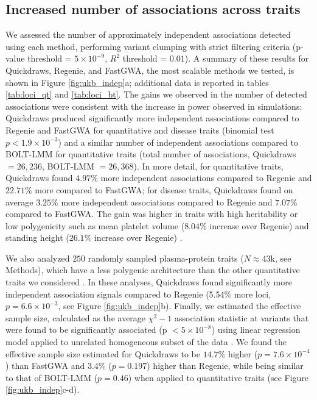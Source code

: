 \clearpage

\subsection{Increased number of associations across traits}
We assessed the number of approximately independent associations detected using each method, performing variant clumping with strict filtering criteria (p-value threshold = $5 \times 10^{-9}$, $R^2$ threshold = $0.01$).
%
A summary of these results for Quickdraws, Regenie, and FastGWA, the most scalable methods we tested, is shown in Figure \ref{fig:ukb_indep}a; additional data is reported in tables \ref{tab:loci_qt} and \ref{tab:loci_bt}. 
%
The gains we observed in the number of detected associations were consistent with the increase in power observed in simulations: Quickdraws produced significantly more independent associations compared to Regenie and FastGWA for quantitative and disease traits (binomial test $p < 1.9 \times 10^{-3}$) and a similar number of independent associations compared to BOLT-LMM for quantitative traits (total number of associations, Quickdraws $=26{,}236$, BOLT-LMM $=26{,}368$).
%
In more detail, for quantitative traits, Quickdraws found $4.97\%$ more independent associations compared to Regenie and $22.71\%$ more compared to FastGWA; for disease traits, Quickdraws found on average $3.25\%$ more independent associations compared to Regenie and $7.07\%$ compared to FastGWA.
%
The gain was higher in traits with high heritability or low polygenicity such as mean platelet volume ($8.04\%$ increase over Regenie) and standing height ($26.1\%$ increase over Regenie) \cite{zeng2021widespread}.
%

%
We also analyzed $250$ randomly sampled plasma-protein traits ($N \approx 43$k, see Methods), which have a less polygenic architecture than the other quantitative traits we considered \cite{sun2023plasma}.
%
In these analyses, Quickdraws found significantly more independent association signals compared to Regenie (5.54\% more loci, $p = 6.6 \times 10^{-3}$, see Figure \ref{fig:ukb_indep}b).
%
Finally, we estimated the effective sample size, calculated as the average $\chi^2 - 1$ association statistic at variants that were found to be significantly associated (p $<5 \times 10^{-8}$) using linear regression model applied to unrelated homogeneous subset of the data \cite{yang2011genomic}.
%
We found the effective sample size estimated for Quickdraws to be $14.7\%$ higher ($p = 7.6 \times 10^{-4}$) than FastGWA and $3.4\%$ ($p = 0.197$) higher than Regenie, while being similar to that of BOLT-LMM ($p = 0.46$) when applied to quantitative traits (see Figure \ref{fig:ukb_indep}c-d).
%

